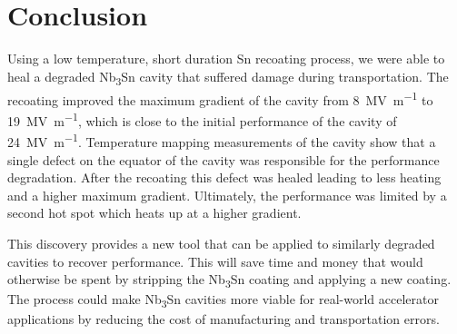 \documentclass{revtex4-2}
\begin{document}
\section{Conclusion}
\label{sec:Conclusion}

Using a low temperature, short duration Sn recoating process, we were able to heal a degraded Nb\textsubscript{3}Sn cavity that suffered damage during transportation. The recoating improved the maximum gradient of the cavity from \qty{8}{\mega\volt\per\meter} to \qty{19}{\mega\volt\per\meter}, which is close to the initial performance of the cavity of \qty{24}{\mega\volt\per\meter}. Temperature mapping measurements of the cavity show that a single defect on the equator of the cavity was responsible for the performance degradation. After the recoating this defect was healed leading to less heating and a higher maximum gradient. Ultimately, the performance was limited by a second hot spot which heats up at a higher gradient.

This discovery provides a new tool that can be applied to similarly degraded cavities to recover performance. This will save time and money that would otherwise be spent by stripping the Nb\textsubscript{3}Sn coating and applying a new coating. The process could make Nb\textsubscript{3}Sn cavities more viable for real-world accelerator applications by reducing the cost of manufacturing and transportation errors.





\end{document}
